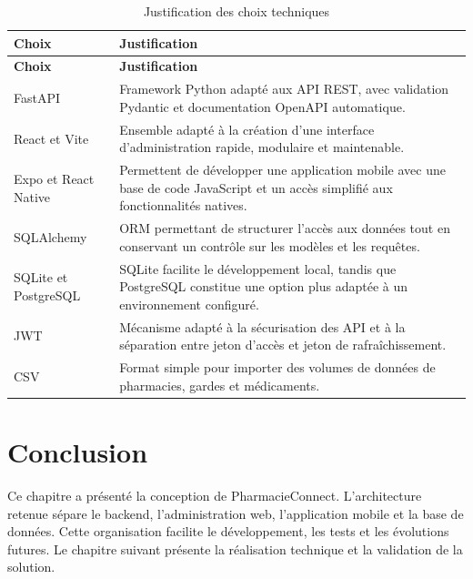 \begin{longtable}{L{4cm}L{10cm}}
    \caption{Justification des choix techniques}\\
    \toprule
    \textbf{Choix} & \textbf{Justification} \\
    \midrule
    \endfirsthead
    \toprule
    \textbf{Choix} & \textbf{Justification} \\
    \midrule
    \endhead
    FastAPI & Framework Python adapté aux API REST, avec validation Pydantic et documentation OpenAPI automatique. \\
    React et Vite & Ensemble adapté à la création d'une interface d'administration rapide, modulaire et maintenable. \\
    Expo et React Native & Permettent de développer une application mobile avec une base de code JavaScript et un accès simplifié aux fonctionnalités natives. \\
    SQLAlchemy & ORM permettant de structurer l'accès aux données tout en conservant un contrôle sur les modèles et les requêtes. \\
    SQLite et PostgreSQL & SQLite facilite le développement local, tandis que PostgreSQL constitue une option plus adaptée à un environnement configuré. \\
    JWT & Mécanisme adapté à la sécurisation des API et à la séparation entre jeton d'accès et jeton de rafraîchissement. \\
    CSV & Format simple pour importer des volumes de données de pharmacies, gardes et médicaments. \\
    \bottomrule
\end{longtable}

\section{Conclusion}

Ce chapitre a présenté la conception de PharmacieConnect. L'architecture retenue sépare le backend,
l'administration web, l'application mobile et la base de données. Cette organisation facilite le
développement, les tests et les évolutions futures. Le chapitre suivant présente la réalisation technique
et la validation de la solution.
